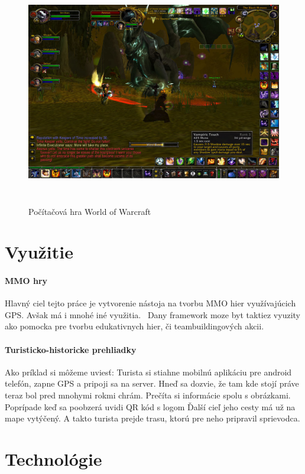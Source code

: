\begin{figure}[h]
  \centering
  \includegraphics[height=10cm]{mainmatter/imgs/wow.jpg}
  \caption{Počítačová hra World of Warcraft}
  \label{fig:comenius}
\end{figure}

\section{Využitie}
\paragraph{MMO hry}
Hlavný ciel tejto práce je vytvorenie nástoja na tvorbu MMO hier využívajúcich GPS. Avšak má i mnohé iné využitia. \
Dany framework moze byt taktiez vyuzity ako pomocka pre tvorbu edukativnych hier, či teambuildingových akcii. 

\paragraph{Turisticko-historicke prehliadky}
Ako príklad si môžeme uviesť: Turista si stiahne mobilnú aplikáciu pre android telefón, zapne GPS a pripoji sa na server. Hneď sa dozvie, že tam kde stojí práve teraz bol pred mnohymi rokmi chrám. Prečíta si informácie spolu s obrázkami. Poprípade keď sa poobzerá uvidi QR kód s logom Ďalší cieľ jeho cesty má už na mape vytýčený. A takto turista prejde trasu, ktorú pre neho pripravil sprievodca. 

\section{Technológie}


